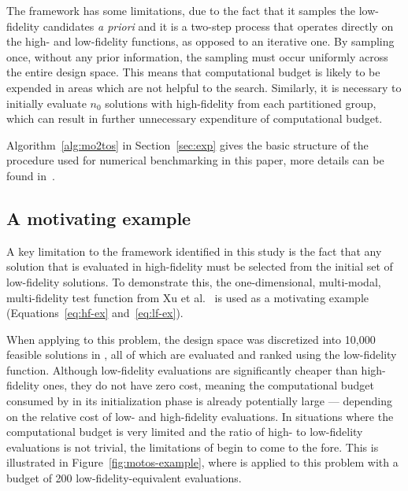 The \motos{} framework has some limitations, due to the fact that it samples the low-fidelity candidates \emph{a priori} and it is a two-step process that operates directly on the high- and low-fidelity functions, as opposed to an iterative one. By sampling once, without any prior information, the sampling must occur uniformly across the entire design space. This means that computational budget is likely to be expended in areas which are not helpful to the search. Similarly, it is necessary to initially evaluate $n_0$ solutions with high-fidelity from each partitioned group, which can result in further unnecessary expenditure of computational budget.%

Algorithm~\ref{alg:mo2tos} in Section~\ref{sec:exp} gives the basic structure of the \motos{} procedure used for numerical benchmarking in this paper, more details can be found in~\cite{xu2016mo2tos}.

\subsection{A motivating example}

A key limitation to the \motos{} framework identified in this study is the fact that any solution that is evaluated in high-fidelity must be selected from the initial set of low-fidelity solutions. To demonstrate this, the one-dimensional, multi-modal, multi-fidelity test function from Xu et al.~\cite{xu2016mo2tos} is used as a motivating example (Equations~\ref{eq:hf-ex} and~\ref{eq:lf-ex}).

When applying \motos{} to this problem, the design space was discretized into 10,000 feasible solutions in \cite{xu2016mo2tos}, all of which are evaluated and ranked using the low-fidelity function. Although low-fidelity evaluations are significantly cheaper than high-fidelity ones, they do not have zero cost, meaning the computational budget consumed by \motos{} in its initialization phase is already potentially large --- depending on the relative cost of low- and high-fidelity evaluations. In situations where the computational budget is very limited and the ratio of high- to low-fidelity evaluations is not trivial, the limitations of \motos{} begin to come to the fore. This is illustrated in Figure~\ref{fig:motos-example}, where \motos{} is applied to this problem with a budget of 200 low-fidelity-equivalent evaluations.

